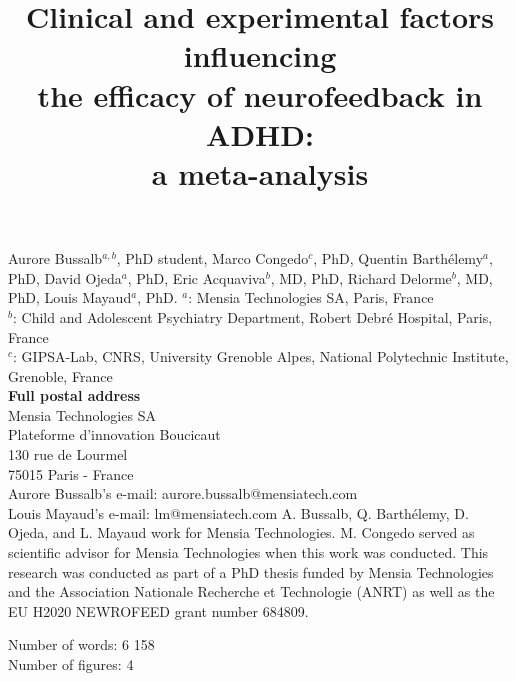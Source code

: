 

\title{Clinical and experimental factors influencing \\ the efficacy of neurofeedback in ADHD: \\ a meta-analysis} %
\maketitle
\noindent Aurore Bussalb$^{a, b}$, PhD student, Marco Congedo$^c$, PhD, Quentin Barth\'elemy$^a$, PhD, David Ojeda$^a$, PhD, 
Eric Acquaviva$^b$, MD, PhD, Richard Delorme$^b$, MD, PhD, Louis Mayaud$^a$, PhD. 
\smallbreak
\noindent $^a$: Mensia Technologies SA, Paris, France \\
\noindent $^b$: Child and Adolescent Psychiatry Department, Robert Debré Hospital, Paris, France \\ 
\noindent $^c$: GIPSA-Lab, CNRS, University Grenoble Alpes, National Polytechnic Institute, Grenoble, France \\
\smallbreak
\noindent\textbf{Full postal address} \\
Mensia Technologies SA\\
Plateforme d'innovation Boucicaut \\
130 rue de Lourmel \\
75015 Paris - France \\
Aurore Bussalb's e-mail: aurore.bussalb@mensiatech.com \\
Louis Mayaud's e-mail: lm@mensiatech.com 
\smallbreak
\noindent A. Bussalb, Q. Barth\'elemy, D. Ojeda, and L. Mayaud work for Mensia Technologies.
M. Congedo served as scientific advisor for Mensia Technologies when this work was conducted. 
\smallbreak
\noindent This research was conducted as part of a PhD thesis funded by Mensia Technologies and the Association Nationale 
Recherche et Technologie (ANRT) as well as the EU H2020 NEWROFEED grant number 684809.

\noindent Number of words: 6 158 \\
\noindent Number of figures: 4 
